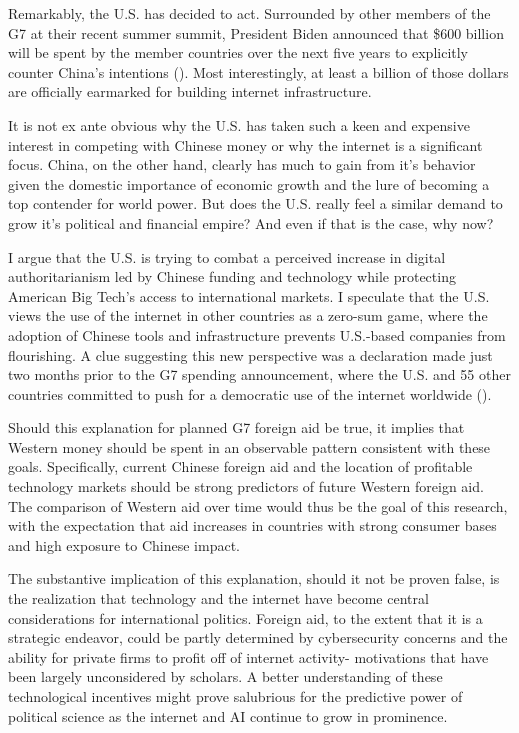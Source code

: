 \documentclass{article}
\begin{document}
Remarkably, the U.S. has decided to act. Surrounded by other members of the G7 at their recent summer summit, President Biden announced that \$600 billion will be spent by the member countries over the next five years to explicitly counter China's intentions (\cite{NPR}). Most interestingly, at least a billion of those dollars are officially earmarked for building internet infrastructure. \nocite{US} \nocite{DSR}

It is not ex ante obvious why the U.S. has taken such a keen and expensive interest in competing with Chinese money or why the internet is a significant focus. China, on the other hand, clearly has much to gain from it's behavior given the domestic importance of economic growth and the lure of becoming a top contender for world power. But does the U.S. really feel a similar demand to grow it's political and financial empire? And even if that is the case, why now?

I argue that the U.S. is trying to combat a perceived increase in digital authoritarianism led by Chinese funding and technology while protecting American Big Tech's access to international markets. I speculate that the U.S. views the use of the internet in other countries as a zero-sum game, where the adoption of Chinese tools and infrastructure prevents U.S.-based companies from flourishing. A clue suggesting this new perspective was a declaration made just two months prior to the G7 spending announcement, where the U.S. and 55 other countries committed to push for a democratic use of the internet worldwide (\cite{Declaration}).

Should this explanation for planned G7 foreign aid be true, it implies that Western money should be spent in an observable pattern consistent with these goals. Specifically, current Chinese foreign aid and the location of profitable technology markets should be strong predictors of future Western foreign aid. The comparison of Western aid over time would thus be the goal of this research, with the expectation that aid increases in countries with strong consumer bases and high exposure to Chinese impact. 

The substantive implication of this explanation, should it not be proven false, is the realization that technology and the internet have become central considerations for international politics. Foreign aid, to the extent that it is a strategic endeavor, could be partly determined by cybersecurity concerns and the ability for private firms to profit off of internet activity- motivations that have been largely unconsidered by scholars. A better understanding of these technological incentives might prove salubrious for the predictive power of political science as the internet and AI continue to grow in prominence.
\printbibliography
\end{document}
